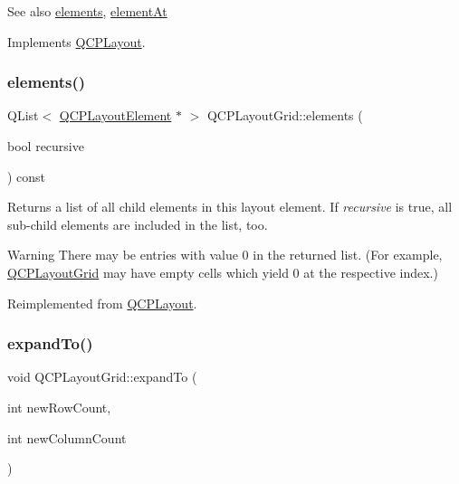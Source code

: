 \begin{DoxySeeAlso}{See also}
\mbox{\hyperlink{class_q_c_p_layout_grid_a20a745d013de4c89cf5de8004a5a36f7}{elements}}, \mbox{\hyperlink{class_q_c_p_layout_grid_a97672ecc379cb3a09639926ba9980297}{element\+At}} 
\end{DoxySeeAlso}


Implements \mbox{\hyperlink{class_q_c_p_layout_a39d3e9ef5d9b82ab1885ba1cb9597e56}{Q\+C\+P\+Layout}}.

\mbox{\label{class_q_c_p_layout_grid_a20a745d013de4c89cf5de8004a5a36f7}} 
\subsubsection{\texorpdfstring{elements()}{elements()}}
{\footnotesize\ttfamily Q\+List$<$ \mbox{\hyperlink{class_q_c_p_layout_element}{Q\+C\+P\+Layout\+Element}} $\ast$ $>$ Q\+C\+P\+Layout\+Grid\+::elements (\begin{DoxyParamCaption}\item[{bool}]{recursive }\end{DoxyParamCaption}) const\hspace{0.3cm}{\ttfamily [virtual]}}

Returns a list of all child elements in this layout element. If {\itshape recursive} is true, all sub-\/child elements are included in the list, too.

\begin{DoxyWarning}{Warning}
There may be entries with value 0 in the returned list. (For example, \mbox{\hyperlink{class_q_c_p_layout_grid}{Q\+C\+P\+Layout\+Grid}} may have empty cells which yield 0 at the respective index.) 
\end{DoxyWarning}


Reimplemented from \mbox{\hyperlink{class_q_c_p_layout_adc9ebc73fc215f9cc22796712a251ff4}{Q\+C\+P\+Layout}}.

\mbox{\label{class_q_c_p_layout_grid_a886c0dcbabd51a45da399e044552b685}} 
\subsubsection{\texorpdfstring{expand\+To()}{expandTo()}}
{\footnotesize\ttfamily void Q\+C\+P\+Layout\+Grid\+::expand\+To (\begin{DoxyParamCaption}\item[{int}]{new\+Row\+Count,  }\item[{int}]{new\+Column\+Count }\end{DoxyParamCaption})}

